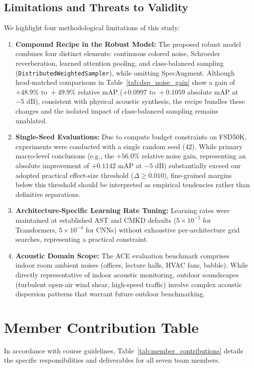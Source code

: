 \documentclass[11pt,a4paper]{article}
\begin{document}
\subsection{Limitations and Threats to Validity}
\label{sec:limitations}
We highlight four methodological limitations of this study:
\begin{enumerate}
    \item \textbf{Compound Recipe in the Robust Model:} The proposed robust model combines four distinct elements: continuous colored noise, Schroeder reverberation, learned attention pooling, and class-balanced sampling (\texttt{DistributedWeightedSampler}), while omitting SpecAugment. Although head-matched comparisons in Table~\ref{tab:dsp_noise_gain} show a gain of $+48.9\%\text{ to }+49.9\%$ relative mAP ($+0.0997\text{ to }+0.1059$ absolute mAP at $-5\text{ dB}$), consistent with physical acoustic synthesis, the recipe bundles these changes and the isolated impact of class-balanced sampling remains unablated.
    \item \textbf{Single-Seed Evaluations:} Due to compute budget constraints on FSD50K, experiments were conducted with a single random seed ($42$). While primary macro-level conclusions (e.g., the $+56.0\%$ relative noise gain, representing an absolute improvement of $+0.1142$ mAP at $-5\text{ dB}$) substantially exceed our adopted practical effect-size threshold ($\Delta \ge 0.010$), fine-grained margins below this threshold should be interpreted as empirical tendencies rather than definitive separations.
    \item \textbf{Architecture-Specific Learning Rate Tuning:} Learning rates were maintained at established AST and CMKD defaults ($5 \times 10^{-5}$ for Transformers, $5 \times 10^{-4}$ for CNNs) without exhaustive per-architecture grid searches, representing a practical constraint.
    \item \textbf{Acoustic Domain Scope:} The ACE evaluation benchmark comprises indoor room ambient noises (offices, lecture halls, HVAC fans, babble). While directly representative of indoor acoustic monitoring, outdoor soundscapes (turbulent open-air wind shear, high-speed traffic) involve complex acoustic dispersion patterns that warrant future outdoor benchmarking.
\end{enumerate}

\section{Member Contribution Table}
In accordance with course guidelines, Table~\ref{tab:member_contributions} details the specific responsibilities and deliverables for all seven team members.
\end{document}
